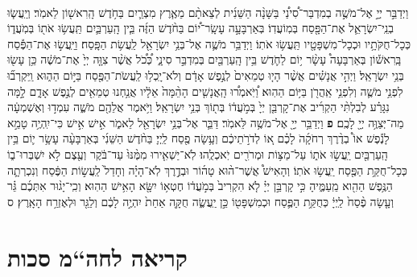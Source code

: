 \documentclass[twoside, openany, parskip=half, 11pt]{book}
\begin{document}
\begin{footnotesize}
\begin{multicols}{2}


\\
וַיְדַבֵּ֣ר יְיָ֣ אֶל־מֹשֶׁ֣ה בְמִדְבַּר־סִ֠ינַ֠י בַּשָּׁנָ֨ה הַשֵּׁנִ֜ית לְצֵאתָ֨ם מֵאֶ֧רֶץ מִצְרַ֛יִם בַּחֹ֥דֶשׁ הָֽרִאשׁ֖וֹן לֵאמֹֽר׃ וְיַֽעֲשׂ֧וּ בְנֵֽי־יִשְׂרָאֵ֛ל אֶת־הַפָּ֖סַח בְּמֽוֹעֲדֽוֹ׃ בְּאַרְבָּעָ֣ה עָשָֽׂר־י֠וֹם בַּחֹ֨דֶשׁ הַזֶּ֜ה בֵּ֧ין הָֽעַרְבַּ֛יִם תַּֽעֲשׂ֥וּ אֹת֖וֹ בְּמֹֽעֲד֑וֹ כְּכָל־חֻקֹּתָ֥יו וּכְכָל־מִשְׁפָּטָ֖יו תַּֽעֲשׂ֥וּ אֹתֽוֹ׃ וַיְדַבֵּ֥ר מֹשֶׁ֛ה אֶל־בְּנֵ֥י יִשְׂרָאֵ֖ל לַֽעֲשׂ֥ת הַפָּֽסַח׃ וַיַּֽעֲשׂ֣וּ אֶת־הַפֶּ֡סַח בָּֽרִאשׁ֡וֹן בְּאַרְבָּעָה֩ עָשָׂ֨ר י֥וֹם לַחֹ֛דֶשׁ בֵּ֥ין הָֽעַרְבַּ֖יִם בְּמִדְבַּ֣ר סִינָ֑י כְּ֠כֹ֠ל אֲשֶׁ֨ר צִוָּ֤ה יְיָ֙ אֶת־מֹשֶׁ֔ה כֵּ֥ן עָשׂ֖וּ בְּנֵ֥י יִשְׂרָאֵֽל׃ 
וַיְהִ֣י אֲנָשִׁ֗ים אֲשֶׁ֨ר הָי֤וּ טְמֵאִים֙ לְנֶ֣פֶשׁ אָדָ֔ם וְלֹא־יָֽכְל֥וּ לַֽעֲשֹׂת־הַפֶּ֖סַח בַּיּ֣וֹם הַה֑וּא וַֽיִּקְרְב֞וּ לִפְנֵ֥י מֹשֶׁ֛ה וְלִפְנֵ֥י אַֽהֲרֹ֖ן בַּיּ֥וֹם הַהֽוּא׃ וַ֠יֹּֽאמְר֠וּ הָֽאֲנָשִׁ֤ים הָהֵ֨מָּה֙ אֵלָ֔יו אֲנַ֥חְנוּ טְמֵאִ֖ים לְנֶ֣פֶשׁ אָדָ֑ם לָ֣מָּה נִגָּרַ֗ע לְבִלְתִּ֨י הַקְרִ֜יב אֶת־קָרְבַּ֤ן יְיָ֙ בְּמֹ֣עֲד֔וֹ בְּת֖וֹךְ בְּנֵ֥י יִשְׂרָאֵֽל׃ וַיֹּ֥אמֶר אֲלֵהֶ֖ם מֹשֶׁ֑ה עִמְד֣וּ וְאֶשְׁמְעָ֔ה מַה־יְּצַוֶּ֥ה יְיָ֖ לָכֶֽם׃ \textbf{פ} 
וַיְדַבֵּ֥ר יְיָ֖ אֶל־מֹשֶׁ֥ה לֵּאמֹֽר׃ דַּבֵּ֛ר אֶל־בְּנֵ֥י יִשְׂרָאֵ֖ל לֵאמֹ֑ר אִ֣ישׁ אִ֣ישׁ כִּי־יִֽהְיֶ֥ה טָמֵ֣א לָנֶ֡פֶשׁ אוֹ֩ בְדֶ֨רֶךְ רְחֹקָ֜הֹ לָכֶ֗ם א֚וֹ לְדֹרֹ֣תֵיכֶ֔ם וְעָ֥שָׂה פֶ֖סַח לַֽיְיָ׃ בַּחֹ֨דֶשׁ הַשֵּׁנִ֜י בְּאַרְבָּעָ֨ה עָשָׂ֥ר י֛וֹם בֵּ֥ין הָֽעַרְבַּ֖יִם יַֽעֲשׂ֣וּ אֹת֑וֹ עַל־מַצּ֥וֹת וּמְרֹרִ֖ים יֹֽאכְלֻֽהוּ׃ לֹֽא־יַשְׁאִ֤ירוּ מִמֶּ֨נּוּ֙ עַד־בֹּ֔קֶר וְעֶ֖צֶם לֹ֣א יִשְׁבְּרוּ־ב֑וֹ כְּכָל־חֻקַּ֥ת הַפֶּ֖סַח יַֽעֲשׂ֥וּ אֹתֽוֹ׃ וְהָאִישׁ֩ אֲשֶׁר־ה֨וּא טָה֜וֹר וּבְדֶ֣רֶךְ לֹֽא־הָיָ֗ה וְחָדַל֙ לַֽעֲשׂ֣וֹת הַפֶּ֔סַח וְנִכְרְתָ֛ה הַנֶּ֥פֶשׁ הַהִ֖וא מֵֽעַמֶּ֑יהָ כִּ֣י קָרְבַּ֣ן יְיָ֗ לֹ֤א הִקְרִיב֙ בְּמֹ֣עֲד֔וֹ חֶטְא֥וֹ יִשָּׂ֖א הָאִ֥ישׁ הַהֽוּא׃ וְכִֽי־יָג֨וּר אִתְּכֶ֜ם גֵּ֗ר וְעָ֤שָׂה פֶ֨סַח֙ לַֽיְיָ֔ כְּחֻקַּ֥ת הַפֶּ֛סַח וּכְמִשְׁפָּט֖וֹ כֵּ֣ן יַֽעֲשֶׂ֑ה חֻקָּ֤ה אַחַת֙ יִהְיֶ֣ה לָכֶ֔ם וְלַגֵּ֖ר וּלְאֶזְרַ֥ח הָאָֽרֶץ׃ ס		

\end{multicols}

\clearpage

\section[חה“מ סכות]{קריאה לחה“מ סכות}


\end{footnotesize}
\end{document}
